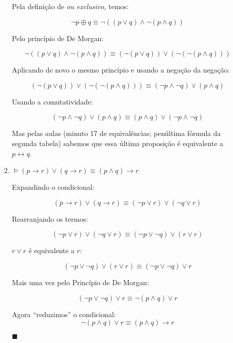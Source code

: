 \documentclass[12pt]{article}
\let\biconditional\leftrightarrow
\begin{document}
\begin{enumerate}
\begin{enumerate}
                Pela definição de \textit{ou exclusivo,} temos:

                \[ \neg p \oplus q \equiv \neg ((p \lor q) \land \neg (p \land q))\] 

                Pelo princípio de De Morgan:

                \[\neg ((p \lor q) \land \neg (p \land q)) \equiv (\neg(p \lor q)) \lor (\neg (\neg (p \land q))) \]

                \sloppy Aplicando de novo o mesmo princípio e usando a negação da negação:

                \[(\neg(p \lor q)) \lor (\neg (\neg (p \land q))) \equiv (\neg p \land \neg q) \lor (p \land q)\]

                Usando a comutatividade:

                \[(\neg p \land \neg q) \lor (p \land q) \equiv (p \land q) \lor (\neg p \land \neg q)\]

                \sloppy Mas pelas aulas (minuto 17 de equivalências; penúltima fórmula da segunda tabela) sabemos que essa última proposição é equivalente a \( p \biconditional q \). 

            \item \( \models (p \to r ) \lor (q \to r ) \equiv (p \land q) \to r \) 

                Expandindo o condicional:

                \[ (p \to r ) \lor (q \to r ) \equiv (\neg p \lor r) \lor ( \neg q \lor r)\] 

                Rearranjando os termos:

                \[ (\neg p \lor r) \lor ( \neg q \lor r) \equiv (\neg p \lor \neg q) \lor (r \lor r)\] 

                \( r \lor r \) é equivalente a \( r \):

                \[ (\neg p \lor \neg q) \lor (r \lor r) \equiv (\neg p \lor \neg q) \lor r \] 

                Mais uma vez pelo Princípio de De Morgan:

                \[ (\neg p \lor \neg q) \lor r \equiv \neg(p \land q) \lor r\] 

                Agora ``reduzimos'' o condicional:
                \[  \neg(p \land q) \lor r \equiv (p \land q ) \to r \] 
                \begin{flushright} \( \blacksquare\) \end{flushright} 
        \end{enumerate}


\end{enumerate}
\end{document}
